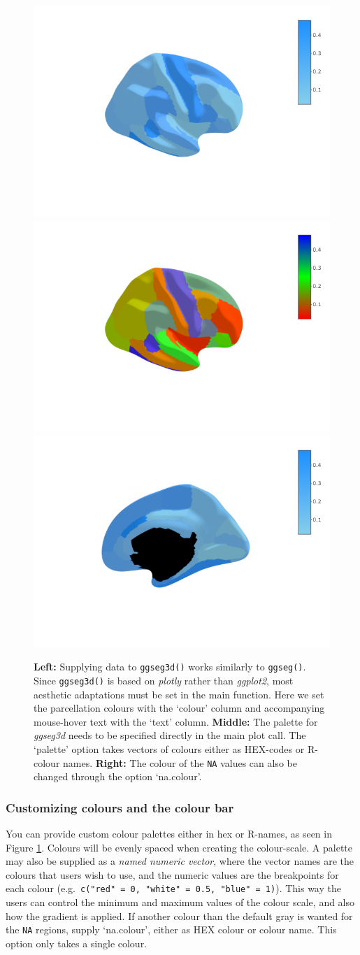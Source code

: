 \documentclass[fleqn,10pt]{wlpeerj} %
\begin{document}
\begin{figure}[H]
\includegraphics[width=0.3\linewidth]{png/ggseg3d_data} \includegraphics[width=0.3\linewidth]{png/ggseg3d_colour} \includegraphics[width=0.3\linewidth]{png/ggseg3d_nacolour} \caption{\textbf{Left:} Supplying data to \texttt{ggseg3d()} works similarly to \texttt{ggseg()}. Since \texttt{ggseg3d()} is based on \emph{plotly} rather than \emph{ggplot2}, most aesthetic adaptations must be set in the main function. Here we set the parcellation colours with the `colour' column and accompanying mouse-hover text with the `text' column. \textbf{Middle:} The palette for \emph{ggseg3d} needs to be specified directly in the main plot call. The `palette' option takes vectors of colours either as HEX-codes or R-colour names. \textbf{Right:} The colour of the \texttt{NA} values can also be changed through the option `na.colour'.}\label{fig:ggseg3d-data1}
\end{figure}

\hypertarget{customizing-colours-and-the-colour-bar}{%
\subsubsection{Customizing colours and the colour bar}\label{customizing-colours-and-the-colour-bar}}

You can provide custom colour palettes either in hex or R-names, as seen in Figure \ref{fig:ggseg3d-data1}.
Colours will be evenly spaced when creating the colour-scale.
A palette may also be supplied as a \emph{named numeric vector}, where the vector names are the colours that users wish to use, and the numeric values are the breakpoints for each colour (e.g.~\texttt{c("red"\ =\ 0,\ "white"\ =\ 0.5,\ "blue"\ =\ 1)}).
This way the users can control the minimum and maximum values of the colour scale, and also how the gradient is applied.
If another colour than the default gray is wanted for the \texttt{NA} regions, supply `na.colour', either as HEX colour or colour name.
This option only takes a single colour.
\end{document}
